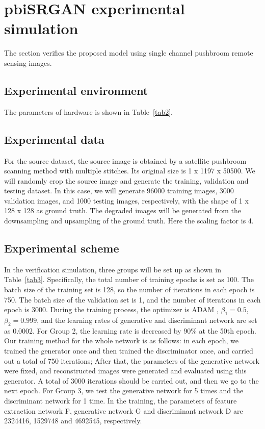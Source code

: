 \documentclass[10pt,twocolumn,letterpaper]{article}
\begin{document}
\section{pbiSRGAN experimental simulation}
The section verifies the proposed model using single channel pushbroom remote sensing images. 

\subsection{Experimental environment}
The parameters of hardware is shown in Table~\ref{tab2}.
 
\subsection{Experimental data}
For the source dataset,  the source image is obtained by a satellite pushbroom scanning method with multiple stitches. Its original size is 1 x 1197 x 50500. We will randomly crop the source image and generate the training, validation and testing dataset. In this case, we will generate 96000 training images, 3000 validation images, and 1000 testing images, respectively, with the shape of 1 x 128 x 128 as ground truth. The degraded images will be generated from the downsampling and upsampling of the ground truth. Here the scaling factor is 4.

\subsection{Experimental scheme}
In the verification simulation, three groups will be set up as shown in Table~\ref{tab3}. Specifically, the total number of training epochs is set as 100. The batch size of the training set is 128, so the number of iterations in each epoch is 750. The batch size of the validation set is 1, and the number of iterations in each epoch is 3000. During the training process, the optimizer is ADAM \cite{Kingma2014ADAM}, $\beta_{1}=0.5$, $\beta_{2}=0.999$, and the learning rates of generative and discriminant network are set as 0.0002. For Group 2, the learning rate is decreased by 90$\%$ at the 50th epoch. Our training method for the whole network is as follows: in each epoch, we trained the generator once and then trained the discriminator once, and carried out a total of 750 iterations; After that, the parameters of the generative network were fixed,  and reconstructed images were generated and evaluated using this generator. A total of 3000 iterations should be carried out, and then we go to the next epoch. For Group 3, we test the generative network for 5 times and the discriminant network for 1 time. In the training, the parameters of feature extraction network F, generative network G and discriminant network D are 2324416, 1529748 and 4692545, respectively.
\end{document}
